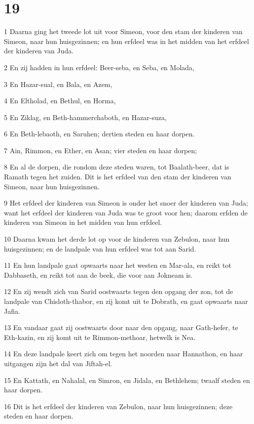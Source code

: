 \chapter{19}

\par 1 Daarna ging het tweede lot uit voor Simeon, voor den stam der kinderen van Simeon, naar hun huisgezinnen; en hun erfdeel was in het midden van het erfdeel der kinderen van Juda.
\par 2 En zij hadden in hun erfdeel: Beer-seba, en Seba, en Molada,
\par 3 En Hazar-sual, en Bala, en Azem,
\par 4 En Eltholad, en Bethul, en Horma,
\par 5 En Ziklag, en Beth-hammerchaboth, en Hazar-suza,
\par 6 En Beth-lebaoth, en Saruhen; dertien steden en haar dorpen.
\par 7 Ain, Rimmon, en Ether, en Asan; vier steden en haar dorpen;
\par 8 En al de dorpen, die rondom deze steden waren, tot Baalath-beer, dat is Ramath tegen het zuiden. Dit is het erfdeel van den stam der kinderen van Simeon, naar hun huisgezinnen.
\par 9 Het erfdeel der kinderen van Simeon is onder het snoer der kinderen van Juda; want het erfdeel der kinderen van Juda was te groot voor hen; daarom erfden de kinderen van Simeon in het midden van hun erfdeel.
\par 10 Daarna kwam het derde lot op voor de kinderen van Zebulon, naar hun huisgezinnen; en de landpale van hun erfdeel was tot aan Sarid.
\par 11 En hun landpale gaat opwaarts naar het westen en Mar-ala, en reikt tot Dabbaseth, en reikt tot aan de beek, die voor aan Jokneam is.
\par 12 En zij wendt zich van Sarid oostwaarts tegen den opgang der zon, tot de landpale van Chisloth-thabor, en zij komt uit te Dobrath, en gaat opwaarts naar Jafia.
\par 13 En vandaar gaat zij oostwaarts door naar den opgang, naar Gath-hefer, te Eth-kazin, en zij komt uit te Rimmon-methoar, hetwelk is Nea.
\par 14 En deze landpale keert zich om tegen het noorden naar Hannathon, en haar uitgangen zijn het dal van Jiftah-el.
\par 15 En Kattath, en Nahalal, en Simron, en Jidala, en Bethlehem; twaalf steden en haar dorpen.
\par 16 Dit is het erfdeel der kinderen van Zebulon, naar hun huisgezinnen; deze steden en haar dorpen.
